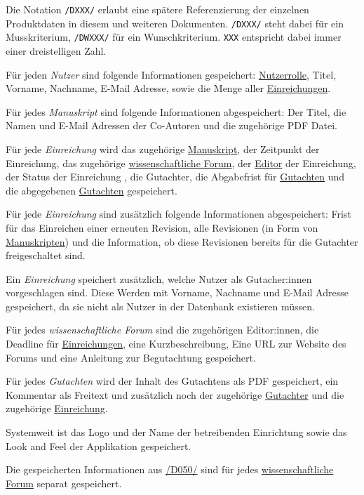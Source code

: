 
Die Notation \texttt{/DXXX/} erlaubt eine spätere Referenzierung der einzelnen Produktdaten in diesem und weiteren
Dokumenten. \texttt{/DXXX/} steht dabei für ein Musskriterium, \texttt{/DWXXX/} für ein Wunschkriterium. \texttt{XXX} entspricht dabei immer einer dreistelligen Zahl.

\begin{description}
	 Für jeden \emph{Nutzer} sind folgende Informationen gespeichert: \hyperref[funkt:nutzer]{Nutzerrolle}, Titel, Vorname, Nachname, E-Mail Adresse, sowie die Menge aller \hyperref[d025]{Einreichungen}.

	 Für jedes \emph{Manuskript} sind folgende Informationen abgespeichert: Der Titel, die Namen und E-Mail Adressen der Co-Autoren und die zugehörige PDF Datei.

	 Für jede \emph{Einreichung} wird das zugehörige \hyperref[d020]{Manuskript}, der Zeitpunkt der Einreichung, das zugehörige \hyperref[d030]{wissenschaftliche Forum}, der \hyperref[funkt:editor]{Editor} der Einreichung, der Status der Einreichung , die Gutachter, die Abgabefrist für \hyperref[d040]{Gutachten} und die abgegebenen \hyperref[d040]{Gutachten} gespeichert.

	 Für jede \emph{Einreichung} sind zusätzlich folgende Informationen abgespeichert: Frist für das Einreichen einer erneuten Revision, alle Revisionen (in Form von \hyperref[d020]{Manuskripten}) und die Information, ob diese Revisionen bereits für die Gutachter freigeschaltet sind.

	 Ein \emph{Einreichung} speichert zusätzlich, welche Nutzer als Gutacher:innen vorgeschlagen sind. Diese Werden mit Vorname, Nachname und E-Mail Adresse gespeichert, da sie nicht als Nutzer in der Datenbank existieren müssen.

	 Für jedes \emph{wissenschaftliche Forum} sind die zugehörigen Editor:innen, die Deadline für \hyperref[d025]{Einreichungen}, eine Kurzbeschreibung, Eine URL zur Website des Forums und eine Anleitung zur Begutachtung gespeichert.

	 Für jedes \emph{Gutachten} wird der Inhalt des Gutachtens als PDF gespeichert, ein Kommentar als Freitext und zusätzlich noch der zugehörige \hyperref[funkt:Gutachter]{Gutachter} und die zugehörige \hyperref[d025]{Einreichung}.

	 Systemweit ist das Logo und der Name der betreibenden Einrichtung sowie das Look and Feel der Applikation gespeichert.

	 Die gespeicherten Informationen aus \hyperref[d050]{/D050/} sind für jedes \hyperref[d030]{wissenschaftliche Forum} separat gespeichert.
\end{description}